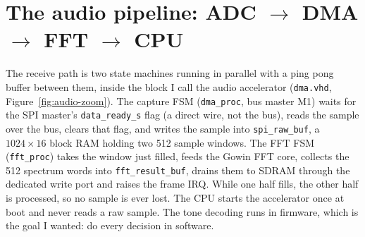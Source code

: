 \documentclass[a4paper,10pt]{article}
\begin{document}
\section{The audio pipeline: ADC $\to$ DMA $\to$ FFT $\to$ CPU}
\label{sec:accel}

The receive path is two state machines running in parallel with a ping pong buffer
between them, inside the block I call the audio accelerator (\texttt{dma.vhd},
Figure~\ref{fig:audio-zoom}). The capture FSM (\texttt{dma\_proc}, bus master M1)
waits for the SPI master's \texttt{data\_ready\_s} flag (a direct wire, not the bus), reads
the sample over the bus, clears that flag, and writes the sample into \texttt{spi\_raw\_buf},
a $1024\times16$ block RAM holding two 512 sample windows. The FFT FSM
(\texttt{fft\_proc}) takes the window just filled, feeds the Gowin FFT core, collects
the 512 spectrum words into \texttt{fft\_result\_buf}, drains them to SDRAM through
the dedicated write port and raises the frame IRQ. While one half fills, the other
half is processed, so no sample is ever lost. The CPU starts the accelerator once at
boot and never reads a raw sample. The tone decoding runs in firmware, which is the
goal I wanted: do every decision in software.
\end{document}
